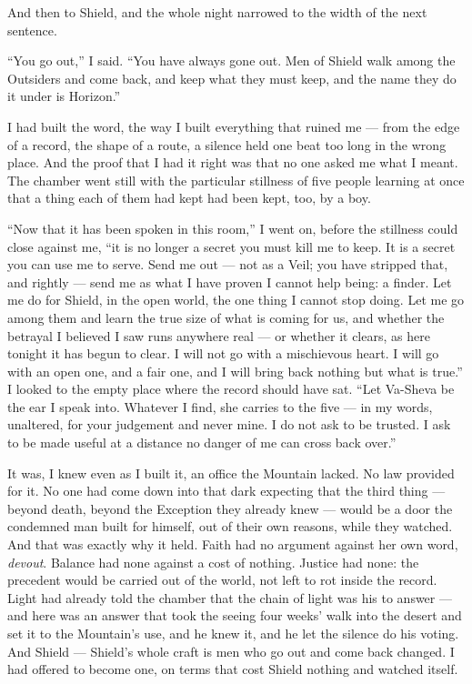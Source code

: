 And then to Shield, and the whole night narrowed to the width of the next sentence.\par

``You go out,'' I said. ``You have always gone out. Men of Shield walk among the Outsiders and come back, and keep what they must keep, and the name they do it under is Horizon.''\par

I had built the word, the way I built everything that ruined me --- from the edge of a record, the shape of a route, a silence held one beat too long in the wrong place. And the proof that I had it right was that no one asked me what I meant. The chamber went still with the particular stillness of five people learning at once that a thing each of them had kept had been kept, too, by a boy.\par

``Now that it has been spoken in this room,'' I went on, before the stillness could close against me, ``it is no longer a secret you must kill me to keep. It is a secret you can use me to serve. Send me out --- not as a Veil; you have stripped that, and rightly --- send me as what I have proven I cannot help being: a finder. Let me do for Shield, in the open world, the one thing I cannot stop doing. Let me go among them and learn the true size of what is coming for us, and whether the betrayal I believed I saw runs anywhere real --- or whether it clears, as here tonight it has begun to clear. I will not go with a mischievous heart. I will go with an open one, and a fair one, and I will bring back nothing but what is true.'' I looked to the empty place where the record should have sat. ``Let Va-Sheva be the ear I speak into. Whatever I find, she carries to the five --- in my words, unaltered, for your judgement and never mine. I do not ask to be trusted. I ask to be made useful at a distance no danger of me can cross back over.''\par

It was, I knew even as I built it, an office the Mountain lacked. No law provided for it. No one had come down into that dark expecting that the third thing --- beyond death, beyond the Exception they already knew --- would be a door the condemned man built for himself, out of their own reasons, while they watched. And that was exactly why it held. Faith had no argument against her own word, \emph{devout}. Balance had none against a cost of nothing. Justice had none: the precedent would be carried out of the world, not left to rot inside the record. Light had already told the chamber that the chain of light was his to answer --- and here was an answer that took the seeing four weeks' walk into the desert and set it to the Mountain's use, and he knew it, and he let the silence do his voting. And Shield --- Shield's whole craft is men who go out and come back changed. I had offered to become one, on terms that cost Shield nothing and watched itself.\par

